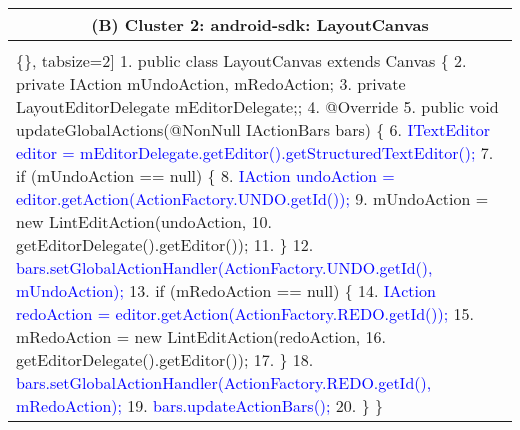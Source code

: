 \begin{figure*}[!htb]
\begin{minipage}{0.5\textwidth}
\begin{tabular}{@{}p{}}
     \\     
\end{tabular} 
\end{minipage}
 \begin{minipage}{0.5\textwidth}
\scriptsize 
\begin{tabular}{@{}p{}} 
 \hline 
  \multicolumn{1}{c}{(B) Cluster 2: android-sdk: LayoutCanvas} \\ \hline
  \vspace{-4mm}
\begin{Verbatim}[commandchars=\\\{\}, tabsize=2]
1. public class LayoutCanvas extends Canvas \{
2.    private IAction mUndoAction, mRedoAction;
3.    private LayoutEditorDelegate mEditorDelegate;;
4.   @Override
5.    public void updateGlobalActions(@NonNull IActionBars bars) \{   
6. \textcolor{blue}{   ITextEditor editor = mEditorDelegate.getEditor().getStructuredTextEditor();}
7.      if (mUndoAction == null) \{
8. \textcolor{blue}{	         IAction undoAction = editor.getAction(ActionFactory.UNDO.getId());}
9.          mUndoAction = new LintEditAction(undoAction, 
10.           getEditorDelegate().getEditor());
11.     \}
12.\textcolor{blue}{	     bars.setGlobalActionHandler(ActionFactory.UNDO.getId(), mUndoAction);}
13.     if (mRedoAction == null) \{
14.\textcolor{blue}{	         IAction redoAction = editor.getAction(ActionFactory.REDO.getId());}
15.         mRedoAction = new LintEditAction(redoAction, 
16.         getEditorDelegate().getEditor());
17.    \}
18.\textcolor{blue}{	    bars.setGlobalActionHandler(ActionFactory.REDO.getId(), mRedoAction);}
19.\textcolor{blue}{	    bars.updateActionBars();}
20.    \}  \}
   \end{Verbatim}
      \vspace{-4mm}
     \\   
\end{tabular} 
\end{minipage}

\end{figure*}
